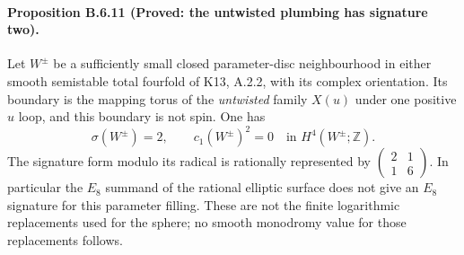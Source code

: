 \paragraph{Proposition B.6.11 (Proved: the untwisted plumbing has signature two).}
Let $W^\pm$ be a sufficiently small closed parameter-disc
neighbourhood in either smooth semistable total fourfold of
K13, A.2.2, with its complex orientation.  Its boundary is the
mapping torus of the \emph{untwisted} family $X(u)$ under one
positive $u$ loop, and this boundary is not spin.  One has
\[
 \sigma(W^\pm)=2,\qquad c_1(W^\pm)^2=0
       \quad\text{in }H^4(W^\pm;\mathbb Z).
 \tag{B.P1}
\]
The signature form modulo its radical is rationally represented by
$\left(\begin{smallmatrix}2&1\\1&6\end{smallmatrix}\right)$.
In particular the $E_8$ summand of the rational elliptic surface
does not give an $E_8$ signature for this parameter filling.
These are not the finite logarithmic replacements used for the
sphere; no smooth monodromy value for those replacements follows.

